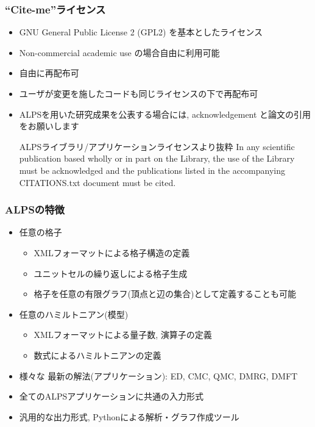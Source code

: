 \begin{frame}[t,fragile]
\frametitle{``Cite-me''ライセンス}
  \begin{itemize}
  \item GNU General Public License 2 (GPL2) を基本としたライセンス
  \item Non-commercial academic use の場合自由に利用可能
  \item 自由に再配布可
  \item ユーザが変更を施したコードも同じライセンスの下で再配布可
  \item ALPSを用いた研究成果を公表する場合には, acknowledgement と論文の引用をお願いします
    \begin{minipage}{.9\textwidth}
    \begin{block}{ALPSライブラリ/アプリケーションライセンスより抜粋}
      In any scientific publication based wholly or in part on the
      Library, the use of the Library must be acknowledged and the
      publications listed in the accompanying CITATIONS.txt document
      must be cited.
    \end{block}
    \end{minipage}
  \end{itemize}
\end{frame}

\begin{frame}[t,fragile]
  \frametitle{ALPSの特徴}
  \begin{itemize}
  \item {\color{red} 任意の}格子
    \begin{itemize}
    \item XMLフォーマットによる格子構造の定義
    \item ユニットセルの繰り返しによる格子生成
    \item 格子を任意の有限グラフ(頂点と辺の集合)として定義することも可能
    \end{itemize}
  \item {\color{red} 任意の}ハミルトニアン(模型)
    \begin{itemize}
    \item XMLフォーマットによる量子数, 演算子の定義
    \item 数式によるハミルトニアンの定義
    \end{itemize}
  \item 様々な{\color{red} 最新の}解法(アプリケーション): ED, CMC, QMC, DMRG, DMFT
  \item {\color{red} 全ての}ALPSアプリケーションに共通の入力形式
  \item {\color{red} 汎用的な}出力形式, Pythonによる解析・グラフ作成ツール
  \end{itemize}
\end{frame}

